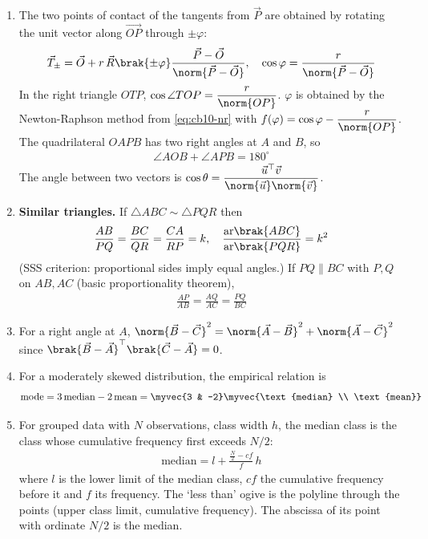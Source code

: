 \begin{enumerate}[label=\thesubsection.\arabic*, ref=\thesubsection.\theenumi,itemsep=0pt]
\item The two points of contact of the tangents from $\vec{P}$ are obtained by rotating the unit vector along $\vec{OP}$ through $\pm\varphi$:
\begin{align}
\vec{T}_{\pm} = \vec{O} + r\,\vec{R}\brak{\pm\varphi}\frac{\vec{P}-\vec{O}}{\norm{\vec{P}-\vec{O}}}, \quad \cos\varphi = \frac{r}{\norm{\vec{P}-\vec{O}}}
\label{eq:cb10-tpoints}
\end{align}
\solution In the right triangle $OTP$, $\cos\angle TOP = \dfrac{r}{\norm{OP}}$. $\varphi$ is obtained by the Newton-Raphson method from \eqref{eq:cb10-nr} with $f(\varphi) = \cos\varphi - \dfrac{r}{\norm{OP}}$. The quadrilateral $OAPB$ has two right angles at $A$ and $B$, so
\begin{align}
\angle AOB + \angle APB = 180^\circ
\label{eq:cb10-quadsum}
\end{align}
The angle between two vectors is $\cos\theta = \dfrac{\vec{u}^{\top}\vec{v}}{\norm{\vec{u}}\norm{\vec{v}}}$.

\item \textbf{Similar triangles.} If $\triangle ABC \sim \triangle PQR$ then
\begin{align}
\frac{AB}{PQ} = \frac{BC}{QR} = \frac{CA}{RP} = k, \quad \frac{\text{ar}\brak{ABC}}{\text{ar}\brak{PQR}} = k^2
\label{eq:cb10-similar}
\end{align}
(SSS criterion: proportional sides imply equal angles.) If $PQ \parallel BC$ with $P, Q$ on $AB, AC$ (basic proportionality theorem),
\begin{align}
\frac{AP}{AB} = \frac{AQ}{AC} = \frac{PQ}{BC}
\label{eq:cb10-bpt}
\end{align}

\item For a right angle at $A$, $\norm{\vec{B}-\vec{C}}^2 = \norm{\vec{A}-\vec{B}}^2 + \norm{\vec{A}-\vec{C}}^2$ since $\brak{\vec{B}-\vec{A}}^{\top}\brak{\vec{C}-\vec{A}} = 0$.
\label{eq:cb10-pyth}

\item For a moderately skewed distribution, the empirical relation is
\begin{align}
\text{mode} = 3\,\text{median} - 2\,\text{mean} = \myvec{3 & -2}\myvec{\text{median} \\ \text{mean}}
\label{eq:cb10-mode}
\end{align}

\item For grouped data with $N$ observations, class width $h$, the median class is the class whose cumulative frequency first exceeds $N/2$:
\begin{align}
\text{median} = l + \frac{\frac{N}{2} - cf}{f}\,h
\label{eq:cb10-median}
\end{align}
where $l$ is the lower limit of the median class, $cf$ the cumulative frequency before it and $f$ its frequency. The `less than' ogive is the polyline through the points (upper class limit, cumulative frequency). The abscissa of its point with ordinate $N/2$ is the median.


\end{enumerate}
